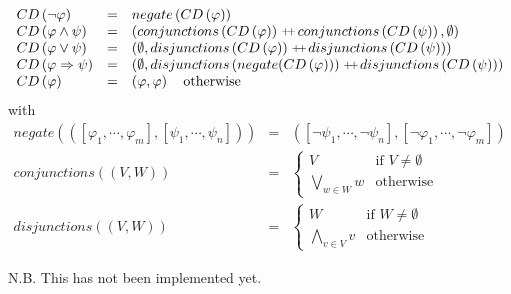 \begin{equation*}
\begin{array}{lll}
CD\left( \lnot \varphi \right) & = & negate\left( CD\left( \varphi \right)
\right) \\
CD\left( \varphi \wedge \psi \right) & = & \left( conjunctions\left(
CD\left( \varphi \right) \right) \concat conjunctions\left( CD\left( \psi
\right) \right) ,\emptyset \right) \\
CD\left( \varphi \vee \psi \right) & = & \left( \emptyset
,disjunctions\left( CD\left( \varphi \right) \right) \concat %
disjunctions\left( CD\left( \psi \right) \right) \right) \\
CD\left( \varphi \Rightarrow \psi \right) & = & \left( \emptyset
,disjunctions\left( negate(CD\left( \varphi \right) )\right) \concat %
disjunctions\left( CD\left( \psi \right) \right) \right) \\
CD\left( \varphi \right) & = & \left( \varphi ,\varphi \right) \text{
otherwise}%
\end{array}%
\end{equation*}%
with%
\begin{equation*}
\begin{array}{lll}
negate\left( \left( \left[ \varphi _{1},\cdots ,\varphi _{m}\right] ,\left[
\psi _{1},\cdots ,\psi _{n}\right] \right) \right) & = & \left( \left[ \lnot
\psi _{1},\cdots ,\lnot \psi _{n}\right] ,\left[ \lnot \varphi _{1},\cdots
,\lnot \varphi _{m}\right] \right) \\
conjunctions\left( \left( V,W\right) \right) & = & \left\{
\begin{array}{ll}
V & \text{if }V\neq \emptyset \\
\bigvee\limits_{w\in W}w & \text{otherwise}%
\end{array}%
\right. \\
disjunctions\left( \left( V,W\right) \right) & = & \left\{
\begin{array}{ll}
W & \text{if }W\neq \emptyset \\
\bigwedge\limits_{v\in V}v & \text{otherwise}%
\end{array}%
\right.%
\end{array}%
\end{equation*}

N.B. This has not been implemented yet.\newpage
